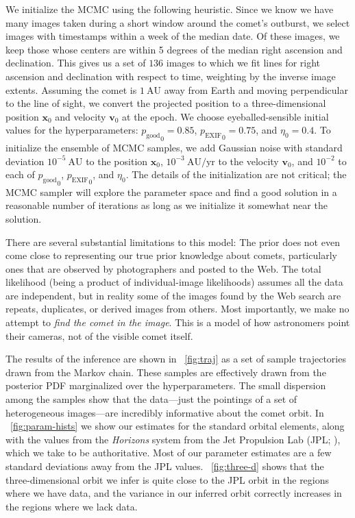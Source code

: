 \documentclass[12pt,preprint]{aastex}
\newcommand{\project}[1]{\textsl{#1}}
\newcommand{\figref}[1]{\figurename~\ref{#1}}
\newcommand{\Figref}[1]{\figref{#1}}
\newcommand{\paramvector}[1]{\boldsymbol{#1}}
\newcommand{\position}{\paramvector{x}}
\newcommand{\velocity}{\paramvector{v}}
\newcommand{\pgood}{p_\mathrm{good}}
\newcommand{\exif}{\mathrm{EXIF}}
\newcommand{\pexif}{p_\exif}
\newcommand{\unit}[1]{\mathrm{#1}}
\renewcommand{\year}{\unit{yr}}
\newcommand{\AU}{\unit{AU}}
\begin{document}
We initialize the MCMC using the following heuristic.  Since we know
we have many images taken during a short window around the comet's
outburst, we select images with timestamps within a week of the median
date.  Of these images, we keep those whose centers are within 5
degrees of the median right ascension and declination.  This gives us
a set of $136$ images to which we fit lines for right ascension and
declination with respect to time, weighting by the inverse image
extents.  Assuming the comet is $1~\AU$ away from Earth and moving
perpendicular to the line of sight, we convert the projected position
to a three-dimensional position $\position_0$ and velocity
$\velocity_0$ at the epoch.  We choose eyeballed-sensible initial
values for the hyperparameters: ${\pgood}_0 = 0.85$, ${\pexif}_0 =
0.75$, and ${\eta}_0 = 0.4$.  To initialize the ensemble of MCMC
samples, we add Gaussian noise with standard deviation $10^{-5}~\AU$
to the position $\position_0$, $10^{-3}~\AU/\year$ to the
velocity $\velocity_0$, and $10^{-2}$ to each of ${\pgood}_0$,
${\pexif}_0$, and ${\eta}_0$.  The details of the initialization are
not critical; the MCMC sampler will explore the parameter space and
find a good solution in a reasonable number of iterations as long as
we initialize it somewhat near the solution.


There are several substantial limitations to this model: The prior
does not even come close to representing our true prior knowledge
about comets, particularly ones that are observed by photographers and
posted to the Web.  The total likelihood (being a product of
individual-image likelihoods) assumes all the data are independent,
but in reality some of the images found by the Web search are repeats,
duplicates, or derived images from others.  Most importantly, we make
no attempt to \emph{find the comet in the image}.  This is a model of
how astronomers point their cameras, not of the visible comet itself.

The results of the inference are shown in \figref{fig:traj} as a set
of sample trajectories drawn from the Markov chain.  These samples are
effectively drawn from the posterior PDF marginalized over the
hyperparameters.  The small dispersion among the samples show that the
data---just the pointings of a set of heterogeneous images---are
incredibly informative about the comet orbit.  In
\figref{fig:param-hists} we show our estimates for the standard
orbital elements, along with the values from the \project{Horizons}
system from the Jet Propulsion Lab (JPL; \citealt{jpl}), which we take
to be authoritative.  Most of our parameter estimates are a few
standard deviations away from the JPL values.  \Figref{fig:three-d}
shows that the three-dimensional orbit we infer is quite close to the
JPL orbit in the regions where we have data, and the variance in our
inferred orbit correctly increases in the regions where we lack data.
\end{document}

